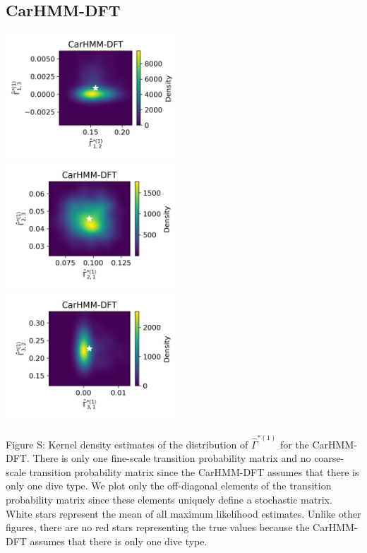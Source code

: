 \documentclass{article}
\begin{document}
        \subsection{CarHMM-DFT}
        \begin{center}
        \includegraphics[width=2.5in]{../Plots/hmm_FV_Gamma_density_0_row_0.png} \\
        \includegraphics[width=2.5in]{../Plots/hmm_FV_Gamma_density_0_row_1.png} \\
        \includegraphics[width=2.5in]{../Plots/hmm_FV_Gamma_density_0_row_2.png} \\
        \end{center}
        
        \noindent Figure S: Kernel density estimates of the distribution of $\hat \Gamma^{*(1)}$ for the CarHMM-DFT. There is only one fine-scale transition probability matrix and no coarse-scale transition probability matrix since the CarHMM-DFT assumes that there is only one dive type. We plot only the off-diagonal elements of the transition probability matrix since these elements uniquely define a stochastic matrix. White stars represent the mean of all maximum likelihood estimates. Unlike other figures, there are no red stars representing the true values because the CarHMM-DFT assumes that there is only one dive type.
        \addtocounter{fignum}{1}
\end{document}
